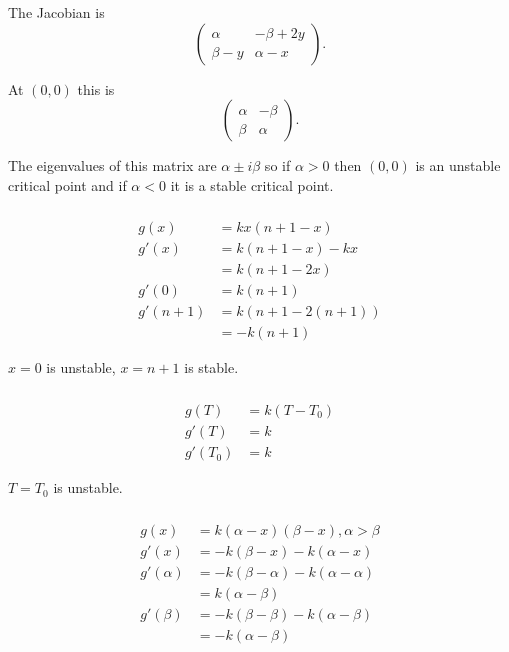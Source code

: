 \documentclass{article}
\begin{document}
The Jacobian is \[\begin{pmatrix}
    \alpha    & -\beta + 2 y \\
    \beta - y & \alpha - x
  \end{pmatrix}.\]

At $(0, 0)$ this is \[\begin{pmatrix}
    \alpha & -\beta \\
    \beta  & \alpha
  \end{pmatrix}.\]

The eigenvalues of this matrix are $\alpha \pm i \beta$ so if $\alpha > 0$ then $(0, 0)$ is an unstable critical point and if $\alpha < 0$ it is a stable critical point.

\setcounter{subsubsection}{2}
\subsubsection{}

\begin{align*}
  g(x)      & = k x (n + 1 - x)       \\
  g'(x)     & = k (n + 1 - x) - k x   \\
            & = k (n + 1 - 2 x)       \\
  g'(0)     & = k (n + 1)             \\
  g'(n + 1) & = k (n + 1 - 2 (n + 1)) \\
            & = -k (n + 1)
\end{align*}

$x = 0$ is unstable, $x = n + 1$ is stable.

\setcounter{subsubsection}{4}
\subsubsection{}

\begin{align*}
  g(T)    & = k (T - T_0) \\
  g'(T)   & = k           \\
  g'(T_0) & = k
\end{align*}

$T = T_0$ is unstable.

\setcounter{subsubsection}{6}
\subsubsection{}

\begin{align*}
  g(x)       & = k (\alpha - x) (\beta - x), \alpha > \beta \\
  g'(x)      & = -k (\beta - x) - k (\alpha - x)            \\
  g'(\alpha) & = -k (\beta - \alpha) - k (\alpha - \alpha)  \\
             & = k (\alpha - \beta)                         \\
  g'(\beta)  & = -k (\beta - \beta) - k (\alpha - \beta)    \\
             & = -k (\alpha - \beta)
\end{align*}
\end{document}
